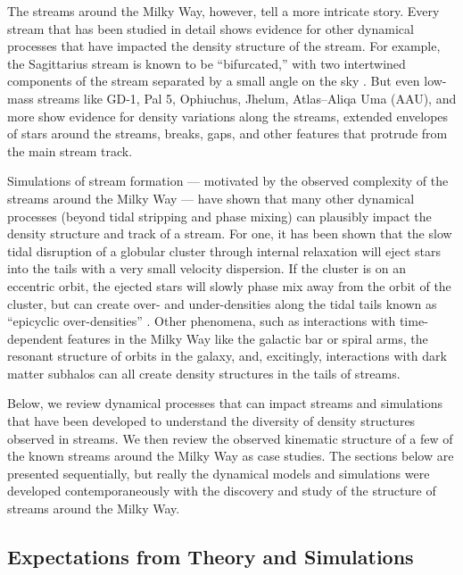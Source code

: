 \documentclass[final,5p,times,twocolumn,authoryear]{elsarticle}
\begin{document}
The streams around the Milky Way, however, tell a more intricate story.
Every stream that has been studied in detail shows evidence for other dynamical
processes that have impacted the density structure of the stream.
For example, the Sagittarius stream is known to be ``bifurcated,'' with two intertwined
components of the stream separated by a small angle on the sky
\citep[e.g.,][]{belokurov:2006}.
But even low-mass streams like GD-1, Pal 5, Ophiuchus, Jhelum, Atlas--Aliqa Uma (AAU),
and more show evidence for density variations along the streams, extended envelopes of
stars around the streams, breaks, gaps, and other features that protrude from the main
stream track.

Simulations of stream formation --- motivated by the observed complexity of the streams
around the Milky Way --- have shown that many other dynamical processes (beyond tidal
stripping and phase mixing) can plausibly impact the density structure and track of a
stream.
For one, it has been shown that the slow tidal disruption of a globular cluster through
internal relaxation will eject stars into the tails with a very small velocity
dispersion.
If the cluster is on an eccentric orbit, the ejected stars will slowly phase mix away
from the orbit of the cluster, but can create over- and under-densities along the tidal
tails known as ``epicyclic over-densities'' \citep{kupper:2010}.
Other phenomena, such as interactions with time-dependent features in the Milky Way like
the galactic bar or spiral arms, the resonant structure of orbits in the galaxy, and,
excitingly, interactions with dark matter subhalos can all create density structures in
the tails of streams.

Below, we review dynamical processes that can impact streams and simulations that have
been developed to understand the diversity of density structures observed in streams.
We then review the observed kinematic structure of a few of the known streams around the
Milky Way as case studies.
The sections below are presented sequentially, but really the dynamical models and
simulations were developed contemporaneously with the discovery and study of the
structure of streams around the Milky Way.


\subsection{Expectations from Theory and Simulations}
\label{sec:structure-theory}
\end{document}
